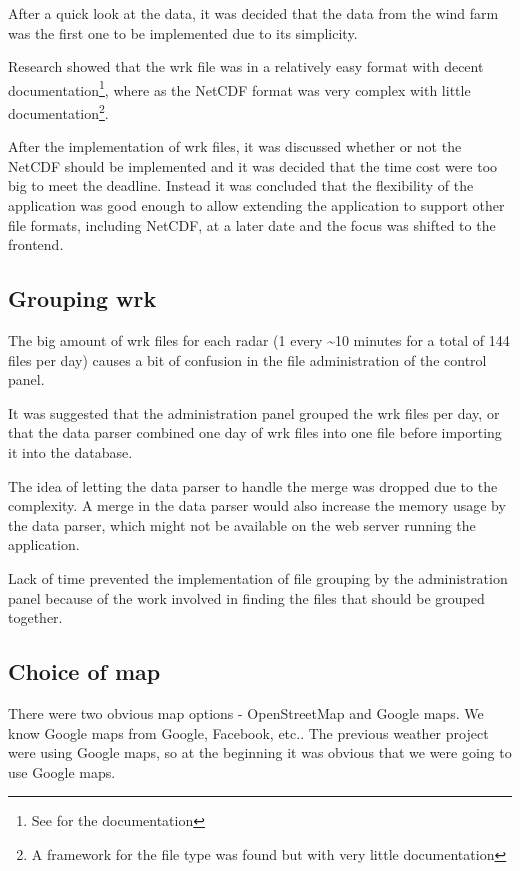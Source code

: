 After a quick look at the data, it was decided that the data from the wind farm was the first one to be implemented due to its simplicity.

Research showed that the wrk file was in a relatively easy format with decent documentation\footnote{See \cite{VRIS} for the documentation}, where as the NetCDF format was very complex with little documentation\footnote{A framework for the file type was found but with very little documentation}.

After the implementation of wrk files, it was discussed whether or not the NetCDF should be implemented and it was decided that the time cost were too big to meet the deadline. Instead it was concluded that the flexibility of the application was good enough to allow extending the application to support other file formats, including NetCDF, at a later date and the focus was shifted to the frontend.

\subsection{Grouping wrk}
The big amount of wrk files for each radar (1 every \textasciitilde 10 minutes for a total of 144 files per day) causes a bit of confusion in the file administration of the control panel.

It was suggested that the administration panel grouped the wrk files per day, or that the data parser combined one day of wrk files into one file before importing it into the database.

The idea of letting the data parser to handle the merge was dropped due to the complexity. A merge in the data parser would also increase the memory usage by the data parser, which might not be available on the web server running the application.

Lack of time prevented the implementation of file grouping by the administration panel because of the work involved in finding the files that should be grouped together.

\subsection{Choice of map}
There were two obvious map options - OpenStreetMap and Google maps. We know Google maps from Google, Facebook, etc.. The previous weather project were using Google maps, so at the beginning it was obvious that we were going to use Google maps.

